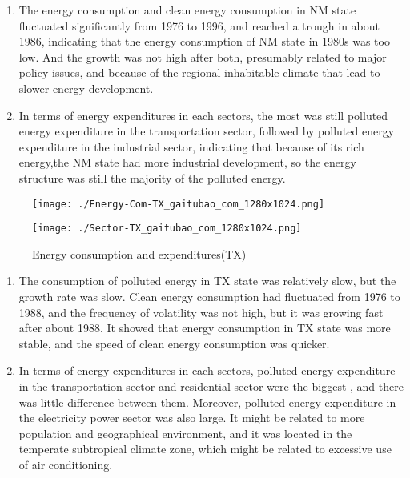 \documentclass[a4paper]{article}
\begin{document}
\begin{enumerate}
\item The energy consumption and clean energy consumption in NM state fluctuated significantly from 1976 to 1996, and reached a trough in about 1986, indicating that the energy consumption of NM state in 1980s was too low. And the growth was not high after both, presumably related to major policy issues, and because of the regional inhabitable climate that lead to slower energy development.

\item In terms of energy expenditures in each sectors, the most was still polluted energy  expenditure in the transportation sector, followed by  polluted energy expenditure in the industrial sector,  indicating that because of its rich energy,the NM state had more industrial development, so the energy structure was still the majority of the polluted energy.
\end{enumerate}



\begin{figure}[H]
\begin{minipage}[t]{0.5\linewidth}
\centering
\texttt{[image: ./Energy-Com-TX\_gaitubao\_com\_1280x1024.png]}
\label{fig:side:a}
\end{minipage}%
\begin{minipage}[t]{0.5\linewidth}
\centering
\texttt{[image: ./Sector-TX\_gaitubao\_com\_1280x1024.png]}
\label{fig:side:b}
\end{minipage}
\caption{Energy consumption and expenditures(TX)}
\end{figure}

\begin{enumerate}
\item The consumption of polluted energy in TX state was relatively slow, but the growth rate was slow. Clean energy consumption had fluctuated from 1976 to 1988, and the frequency of volatility was not high, but it was growing fast after about 1988. It showed that energy consumption in TX state was more stable, and the speed of clean energy consumption was quicker.

\item In terms of energy expenditures in each sectors,  polluted energy expenditure in the transportation sector and residential sector  were the biggest , and there was little difference between them. Moreover, polluted energy expenditure in the electricity power sector was also large. It might be related to more population and geographical environment, and it was located in the temperate subtropical climate zone, which might be related to excessive use of air conditioning.
\end{enumerate}
\end{document}

